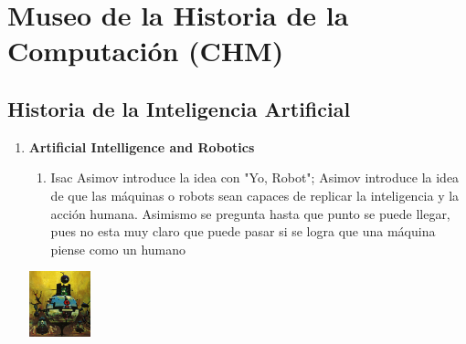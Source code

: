 \documentclass{report}
\begin{document}
\section*{Museo de la Historia de la Computación (CHM)}
\subsection*{Historia de la Inteligencia Artificial}
    \begin{enumerate}
	    \item \textbf{Artificial Intelligence and Robotics}
	    	\begin{enumerate}
			\item Isac Asimov introduce la idea con "Yo, Robot"; Asimov introduce la idea de que las máquinas o robots sean capaces de replicar la inteligencia y la acción humana. Asimismo se pregunta hasta que punto se puede llegar, pues no esta muy claro que puede pasar si se logra que una máquina piense como un humano 
		\end{enumerate}
	\begin{center}
	          \includegraphics[width=0.7in]{asimov.png}
  	\end{center} 


\end{enumerate}
\end{document}
